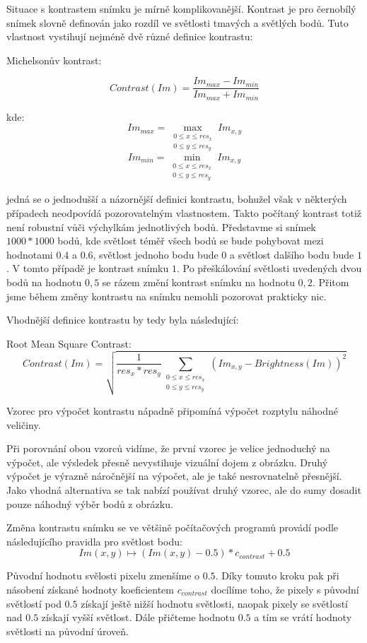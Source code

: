 Situace s kontrastem snímku je mírně komplikovanější. Kontrast je pro černobílý snímek slovně definován jako rozdíl ve světlosti tmavých a světlých bodů. Tuto vlastnost vystihují nejméně dvě různé definice kontrastu:

Michelsonův kontrast:

\[
Contrast(Im) = \frac{Im_{max}-Im_{min}}{Im_{max}+Im_{min}}
\]

kde:
\[
Im_{max} = \max_{\substack{ 0 \leq x \leq res_{x} \\ 0 \leq y \leq res_{y} }}{Im_{x,y}} 
\]
\[
Im_{min} = \min_{\substack{ 0 \leq x \leq res_{x} \\ 0 \leq y \leq res_{y} }}{Im_{x,y}}
\]

jedná se o jednodušší a názornější definici kontrastu, bohužel však v některých případech neodpovídá pozorovatelným vlastnostem. Takto počítaný kontrast totiž není robustní vůči výchylkám jednotlivých bodů. Představme si snímek $1000*1000$ bodů, kde světlost téměř všech bodů se bude pohybovat mezi hodnotami $0.4$ a $0.6$, světlost jednoho bodu bude $0$ a světlost dalšího bodu bude $1$. V tomto případě je kontrast snímku $1$. Po přeškálování světlosti uvedených dvou bodů na hodnotu $0,5$ se rázem změní kontrast snímku na hodnotu $0,2$. Přitom jsme během změny kontrastu na snímku nemohli pozorovat prakticky nic.

Vhodnější definice kontrastu by tedy byla následující:

Root Mean Square Contrast:
\[
Contrast(Im) = \sqrt{\frac{1}{res_{x}*res_{y}}\sum_{\substack{ 0 \leq x \leq res_{x} \\ 0 \leq y \leq res_{y} }}(Im_{x,y}-Brightness(Im))^2}
\]

Vzorec pro výpočet kontrastu nápadně připomíná výpočet rozptylu náhodné veličiny. 

Při porovnání obou vzorců vidíme, že první vzorec je velice jednoduchý na výpočet, ale výsledek přesně nevystihuje vizuální dojem z obrázku. Druhý výpočet je výrazně náročnější na výpočet, ale je také nesrovnatelně přesnější. Jako vhodná alternativa se tak nabízí používat druhý vzorec, ale do sumy dosadit pouze náhodný výběr bodů z obrázku.

Změna kontrastu snímku se ve většině počítačových programů provádí podle následujícího pravidla pro světlost bodu:
\[
  Im(x,y) \longmapsto   (Im(x,y) - 0.5)*c_{contrast} + 0.5
\]

Původní hodnotu svělosti pixelu zmenšíme o $0.5$. Díky tomuto kroku pak při násobení získané hodnoty koeficientem $c_{contrast}$ docílíme toho, že pixely s původní světlostí pod $0.5$ získají ještě nižší hodnotu světlosti, naopak pixely se světlostí nad $0.5$ získají vyšší světlost. Dále přičteme hodnotu $0.5$ a tím se vrátí hodnoty světlosti na původní úroveň.

